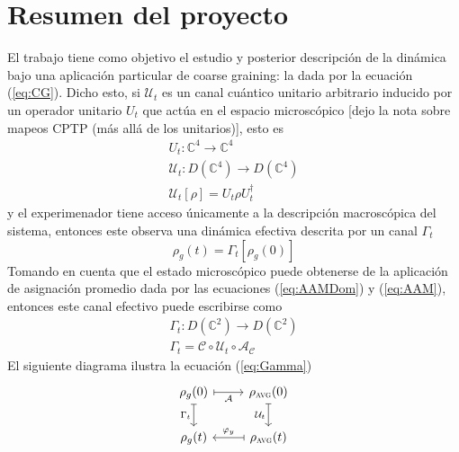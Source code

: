 \documentclass[onecolumn,11pt]{article}
\newcommand{\mcU}{\mathcal{U}}
\newcommand{\mcC}{\mathcal{C}}
\newcommand{\mcA}{\mathcal{A}}
\newcommand{\Complex}{\mathbb{C}} %
\newcommand{\notaAd}[1]{{\color{blue} [#1]}} %
\begin{document}
\section{Resumen del proyecto}

El trabajo tiene como objetivo el estudio y posterior descripción de la dinámica bajo una aplicación particular de coarse graining: la dada por la ecuación (\ref{eq:CG}). Dicho esto, si $\mcU_{t}$ es un canal cuántico unitario arbitrario inducido por un operador unitario $U_{t}$ que actúa en el espacio microscópico\notaAd{dejo la nota sobre mapeos CPTP (más allá de los unitarios)}, esto es
\begin{gather}
U_{t}:\Complex^{4} \rightarrow \Complex^{4} \label{eq:UnitOpDyn}\\
\mcU_{t}:D(\Complex^{4})\rightarrow D(\Complex^{4}) \label{eq:UnitChaDyn}\\
\mcU_{t}[\rho]=U_{t}\rho U_{t}^{\dag}
\end{gather}
y el experimenador tiene acceso únicamente a la descripción macroscópica del sistema, entonces este observa una dinámica efectiva descrita por un canal $\Gamma_{t}$
\begin{equation}
\rho_{g}(t)=\Gamma_{t}[\rho_{g}(0)]
\end{equation}
Tomando en cuenta que el estado microscópico puede obtenerse de la aplicación de asignación promedio dada por las ecuaciones (\ref{eq:AAMDom}) y (\ref{eq:AAM}), entonces este canal efectivo puede escribirse como
\begin{gather}
\Gamma_{t}:D(\Complex^{2})\rightarrow D(\Complex^{2})\label{eq:GammaDom}\\
\Gamma_{t}=\mcC\circ\mcU_{t}\circ\mcA_{\mcC}\label{eq:Gamma}
\end{gather}
El siguiente diagrama ilustra la ecuación (\ref{eq:Gamma})
\[\begin{tikzcd}[arrows={<-|}]
\rho_{g}(0)  & \rho_{\textsc{avg}}(0) \arrow{l}{\mcA} \\
\rho_{g}(t) \arrow{u}{\Gamma_{t}} \arrow{r}{\varphi_y} & \rho_{\textsc{avg}}(t) \arrow{u}{\mcU_{t}}
\end{tikzcd}
\]
\end{document}
